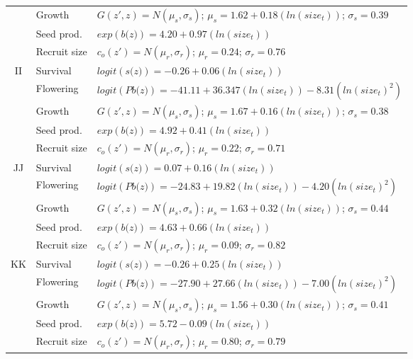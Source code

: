 \documentclass[12pt, letterpaper]{article}
\begin{document}
\begin{spacing}{1.3}
\begin{longtable}[ht]{c|l|p{}}
         & Growth  &  $G(z',z) = N(\mu_s, \sigma_s)$; $\mu_s = 1.62 + 0.18(ln(size_t))$; $\sigma_s = 0.39$\\
         \rowcolor[gray]{.95}& Seed prod.  & $exp(\textit{b(z)}) = 4.20 + 0.97(ln(size_t))$  \\
         & Recruit size  &  $c_o(z') = N(\mu_r, \sigma_r)$; $\mu_r = 0.24$; $\sigma_r = 0.76$ \\ 
         \hline
         \rowcolor[gray]{.95}II  &  Survival  &  $logit(\textit{s(z)})= -0.26+0.06(ln(size_t))$ \\
         & Flowering  & $logit(\textit{Pb(z)})  = -41.11 + 36.347(ln(size_t)) -8.31(ln(size_t)^2)$ \\
         \rowcolor[gray]{.95}& Growth  &  $G(z',z) = N(\mu_s, \sigma_s)$; $\mu_s = 1.67 + 0.16(ln(size_t))$; $\sigma_s = 0.38$\\
         & Seed prod.  & $exp(\textit{b(z)}) = 4.92 + 0.41(ln(size_t))$  \\
         \rowcolor[gray]{.95}& Recruit size  &  $c_o(z') = N(\mu_r, \sigma_r)$; $\mu_r = 0.22$; $\sigma_r = 0.71$ \\
         \hline
         JJ  &  Survival  &  $logit(\textit{s(z)})= 0.07+0.16(ln(size_t))$ \\
         \rowcolor[gray]{.95}& Flowering  & $logit(\textit{Pb(z)})  = -24.83 + 19.82(ln(size_t)) -4.20(ln(size_t)^2)$ \\
         & Growth  &  $G(z',z) = N(\mu_s, \sigma_s)$; $\mu_s = 1.63 + 0.32(ln(size_t))$; $\sigma_s = 0.44$\\
         \rowcolor[gray]{.95}& Seed prod.  & $exp(\textit{b(z)}) = 4.63 + 0.66(ln(size_t))$  \\
         & Recruit size  &  $c_o(z') = N(\mu_r, \sigma_r)$; $\mu_r = 0.09$; $\sigma_r = 0.82$ \\
         \hline
         \rowcolor[gray]{.95}KK  &  Survival  &  $logit(\textit{s(z)})= -0.26+0.25(ln(size_t))$ \\
         & Flowering  & $logit(\textit{Pb(z)})  = -27.90 + 27.66(ln(size_t)) -7.00(ln(size_t)^2)$ \\
        \rowcolor[gray]{.95} & Growth  &  $G(z',z) = N(\mu_s, \sigma_s)$; $\mu_s = 1.56 + 0.30(ln(size_t))$; $\sigma_s = 0.41$\\
         & Seed prod.  & $exp(\textit{b(z)}) = 5.72 -0.09(ln(size_t))$  \\
         \rowcolor[gray]{.95}& Recruit size  &  $c_o(z') = N(\mu_r, \sigma_r)$; $\mu_r = 0.80$; $\sigma_r = 0.79$ \\

\end{longtable}
\end{spacing}
\end{document}
